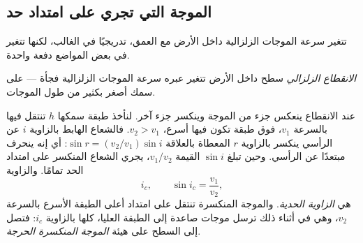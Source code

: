 \subsection{الموجة التي تجري على امتداد حد}

تتغير سرعة الموجات الزلزالية داخل الأرض مع العمق، تدريجيًا في
الغالب، لكنها تتغير في بعض المواضع دفعة واحدة.

\begin{definition}\label{def:g11:seismic-structure:discontinuity}
\emph{الانقطاع الزلزالي} سطح
داخل الأرض تتغير عبره سرعة الموجات الزلزالية
فجأة --- على سمك أصغر بكثير من طول الموجات.
\end{definition}

عند الانقطاع ينعكس جزء من الموجة وينكسر جزء آخر. لنأخذ
طبقة سمكها $h$ تنتقل فيها  بالسرعة $v_1$، فوق طبقة
تكون فيها أسرع، $v_2 > v_1$. فالشعاع الهابط بالزاوية $i$ عن
الرأسي ينكسر بالزاوية $r$ المعطاة بالعلاقة $\sin r = (v_2/v_1)\sin
i$: أي إنه ينحرف مبتعدًا عن الرأسي. وحين تبلغ $\sin i$ القيمة $v_1/v_2$، يجري
الشعاع المنكسر على امتداد الحد تمامًا. والزاوية
\[
  i_c, \qquad \sin i_c = \frac{v_1}{v_2},
\]
هي \emph{الزاوية الحدية}. والموجة المنكسرة  تنتقل على امتداد أعلى الطبقة الأسرع بالسرعة $v_2$،
وهي في أثناء ذلك ترسل موجات صاعدة إلى الطبقة العليا، كلها بالزاوية
$i_c$: فتصل إلى السطح على هيئة \emph{الموجة المنكسرة الحرجة}.


